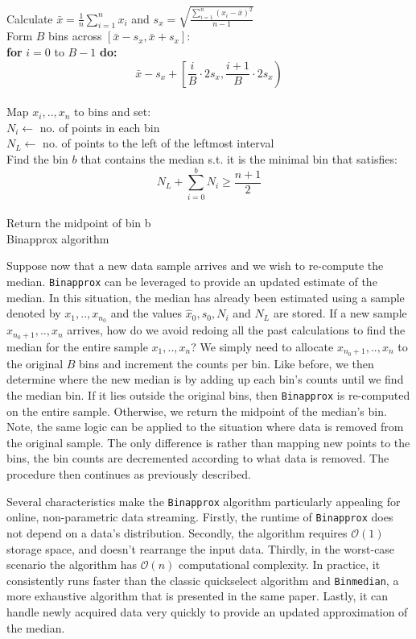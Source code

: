 \begin{center}
\begin{algorithm}[H]
\SetAlgoLined
{}
Calculate $\bar{x}=\frac{1}{n} \sum_{i=1}^n x_i$ and $s_x=\sqrt{\frac{ \sum_{i=1}^n(x_i - \bar{x})^2}{n-1}}$\\
Form $B$ bins across $[\bar{x} - s_x, \bar{x} + s_x]$:\\
 \Indp \textbf{for} $i=0$ to $B-1$ \textbf{do:} $$\bar{x} - s_x + \left[\frac{i}{B} \cdot 2s_x, \frac{i+1}{B} \cdot 2s_x \right)$$\\
\Indm Map $x_i,..,x_n$ to bins and set:\\
\Indp$N_i \leftarrow$ no. of points in each bin \\
 $N_L \leftarrow$ no. of points to the left of the leftmost interval  \\
\Indm Find the bin $b$ that contains the median s.t. it is the minimal bin that satisfies: $$N_L + \sum_{i=0}^b N_i \geq \frac{n+1}{2}$$\\
Return the midpoint of bin b\\
 \caption{Binapprox algorithm}
\end{algorithm}
\end{center}

Suppose now that a new data sample arrives and we wish to re-compute the median. \texttt{Binapprox} can be leveraged to provide an updated estimate of the median. In this situation, the median has already been estimated using a sample denoted by $x_1,..,x_{n_0}$ and the values $\hat{x}_0, s_0, N_i$ and  $N_L$ are stored. If a new sample $x_{n_0+1},..,x_{n}$ arrives, how do we avoid redoing all the past calculations to find the median for the entire sample $x_1,..,x_n$? We simply need to allocate $x_{n_0+1},..,x_{n}$  to the original $B$ bins and increment the counts per bin. Like before, we then determine where the new median is by adding up each bin's counts until we find the median bin. If it lies outside the original bins, then \texttt{Binapprox} is re-computed on the entire sample. Otherwise, we return the midpoint of the median's bin. Note, the same logic can be applied to the situation where data is removed from the original sample. The only difference is rather than mapping new points to the bins, the bin counts are decremented according to what data is removed. The procedure then continues as previously described.

Several characteristics make the \texttt{Binapprox} algorithm particularly appealing for online, non-parametric data streaming.  Firstly, the runtime of \texttt{Binapprox} does not depend on a data's distribution. Secondly, the algorithm requires $\mathcal{O}(1)$ storage space, and doesn't rearrange the input data. Thirdly, in the worst-case scenario the algorithm has $\mathcal{O}(n)$ computational complexity. In practice, it consistently runs faster than the classic quickselect algorithm and \texttt{Binmedian}, a more exhaustive  algorithm that is presented in the same paper. Lastly, it can handle newly acquired data very quickly to provide an updated approximation of the median. 

